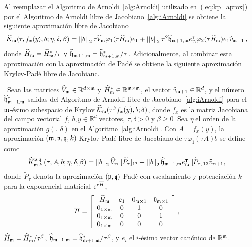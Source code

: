 Al reemplazar el Algoritmo de Arnoldi~\ref{alg:Arnoldi} utilizado en~(\ref{eq:kp_aprox}) por el Algoritmo de Arnoldi libre de Jacobiano~\ref{alg:iArnoldi} se obtiene la siguiente aproximación libre de Jacobiano
 \begin{equation*}
	\widehat{K}_{\mathfrak{m}}(\tau,f_x(y) , b ; \eta, \delta, \beta) = \left\lvert \left\lvert  b  \right\rvert \right\rvert_2\tau \widehat{V}_{\mathfrak{m}}\varphi_1(\tau \widehat{H}_{\mathfrak{m}})e_1 + \left\lvert \left\lvert  b  \right\rvert \right\rvert_2\tau^2\widehat{\mathfrak{h}}_{\mathfrak{m}+1,\mathfrak{m}}e^\intercal_{\mathfrak{m}}\varphi_2(\tau \widehat{H}_{\mathfrak{m}})e_1\widehat{v}_{\mathfrak{m}+1}\,,
\end{equation*}
donde $\widehat{H}_{\mathfrak{m}}=\widehat{H}^*_{\mathfrak{m}}/\tau$ y $\widehat{\mathfrak{h}}_{\mathfrak{m}+1,\mathfrak{m}}=\widehat{\mathfrak{h}}^*_{\mathfrak{m}+1,\mathfrak{m}}/\tau$. Adicionalmente, al combinar esta aproximación con la aproximación de Padé se obtiene la siguiente aproximación Krylov-Padé libre de Jacobiano.
\begin{definition}\label{def:gen_kp_aprox_fj}
	\cite{naranjo2023jacobian}~Sean las matrices $\widehat{V}_{\mathfrak{m}}\in\mathbb{R}^{d\times \mathfrak{m}}$ y $\widehat{H}^*_{\mathfrak{m}}\in\mathbb{R}^{{\mathfrak{m}} \times {\mathfrak{m}}}$, el vector $\widehat{v}_{\mathfrak{m}+1}\in\mathbb{R}^d$, y el número  $ \widehat{\mathfrak{h}}^*_{\mathfrak{m}+1,\mathfrak{m}}$ salidas del Algoritmo de Arnoldi libre de Jacobiano~\ref{alg:iArnoldi} para el $\mathfrak{m}$-ésimo subespacio de Krylov $\widehat{\mathcal{K}}_{\mathfrak{m}}(\tau^\beta f_x(y),b;\delta)$, donde $f_x$ es la matriz Jacobiana del campo vectorial $f$, $b,y\in\mathbb{R}^d$ vectores, $\tau,\delta>0$ y $\beta \ge 0$. Sea $\eta$ el orden de la aproximación $g(.;\delta)$ en el Algoritmo~\ref{alg:iArnoldi}. Con $A=f_x(y)$, la aproximación $(\mathfrak{m} , \mathfrak{p} ,\mathfrak{q} , k)$-Krylov-Padé libre de Jacobiano de $\tau \varphi_1(\tau A)b$ se define como
	\begin{equation} \label{eq:gen_kp_aprox_fj}
		\widehat{K}_{\mathfrak{m},k}^{\mathfrak{p},\mathfrak{q}}\left(\tau, A , b ; \eta, \delta, \beta \right)=\left\lvert \left\lvert b \right\rvert \right\rvert_2 \widehat{V}_{\mathfrak{m}}\;[\widetilde{P}_{\tau}]_{12} + \left\lvert \left\lvert b \right\rvert \right\rvert_2 \widehat{\mathfrak{h}}_{\mathfrak{m}+1,\mathfrak{m}}e_{\mathfrak{m}}^\intercal\;[\widetilde{P}_{\tau}]_{13} \widehat{v}_{\mathfrak{m}+1},
	\end{equation}
	donde $\widetilde{P}_{\tau}$ denota la aproximación $(\mathfrak{p},\mathfrak{q})$-Padé con escalamiento y potenciación $k$ para la exponencial matricial $\mathrm{e}^{\tau\overline{H}}$,
	\begin{equation}
		\overline{H} = \left[\begin{array}{cccc}
			\widehat{H}_{\mathfrak{m}} & e_1 & 0_{\mathfrak{m}\times 1} & 0_{\mathfrak{m}\times 1}\\
			0_{1\times\mathfrak{m}} & 0 & 1 & 0\\
			0_{1\times\mathfrak{m}} & 0 & 0 & 1\\
			0_{1\times\mathfrak{m}} & 0 & 0 & 0
		\end{array}\right],
	\end{equation}
	$\widehat{H}_{\mathfrak{m}}=\widehat{H}^*_{\mathfrak{m}}/\tau^\beta$, $\widehat{\mathfrak{h}}_{\mathfrak{m}+1,\mathfrak{m}}=\widehat{\mathfrak{h}}^*_{\mathfrak{m}+1,\mathfrak{m}}/\tau^\beta$, y $e_i$ el $i$-ésimo vector canónico de $\mathbb{R}^{\mathfrak{m}}$.
\end{definition}

